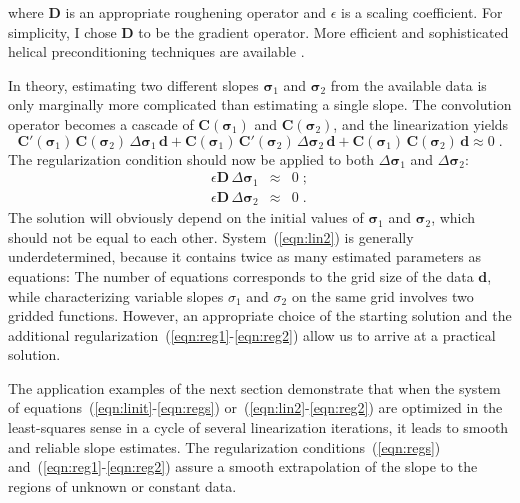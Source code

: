 where $\mathbf{D}$ is an appropriate roughening operator and $\epsilon$
is a scaling coefficient. For simplicity, I chose $\mathbf{D}$ to be the
gradient operator. More efficient and sophisticated helical
preconditioning techniques are available 
\cite[]{GEO63-05-15321541,Fomel.sepphd.107,fandc}.
\par
In theory, estimating two different slopes $\mathbf{\sigma}_1$ and
$\mathbf{\sigma}_2$ from the available data is only marginally more
complicated than estimating a single slope. The convolution operator
becomes a cascade of $\mathbf{C}(\mathbf{\sigma}_1)$ and
$\mathbf{C}(\mathbf{\sigma}_2)$, and the linearization yields
\begin{equation}
  \label{eqn:lin2}
  \mathbf{C}'(\mathbf{\sigma}_1) \, \mathbf{C}(\mathbf{\sigma}_2) \, 
  \Delta \mathbf{\sigma}_1\, \mathbf{d} + \mathbf{C}(\mathbf{\sigma}_1) \, 
  \mathbf{C}'(\mathbf{\sigma}_2) \,
  \Delta \mathbf{\sigma}_2 \, \mathbf{d} + \mathbf{C}(\mathbf{\sigma}_1) \,
  \mathbf{C}(\mathbf{\sigma}_2) \, \mathbf{d} \approx 0\;.
\end{equation}
The regularization condition should now be applied to both $\Delta
\mathbf{\sigma}_1$ and $\Delta \mathbf{\sigma}_2$:
 \begin{eqnarray}
  \label{eqn:reg1}
  \epsilon \mathbf{D} \, \Delta \mathbf{\sigma}_1 & \approx & 0\;; \\
  \label{eqn:reg2}
  \epsilon \mathbf{D} \, \Delta \mathbf{\sigma}_2 & \approx & 0\;.
\end{eqnarray}
The solution will obviously depend on the initial values of
$\mathbf{\sigma}_1$ and $\mathbf{\sigma}_2$, which should not be equal to
each other. System~(\ref{eqn:lin2}) is generally underdetermined,
because it contains twice as many estimated parameters as equations:
The number of equations corresponds to the grid size of the data
$\mathbf{d}$, while characterizing variable slopes $\sigma_1$ and
$\sigma_2$ on the same grid involves two gridded functions.  However,
an appropriate choice of the starting solution and the additional
regularization~(\ref{eqn:reg1}-\ref{eqn:reg2}) allow us to arrive at a
practical solution.
\par
The application examples of the next section demonstrate that when the
system of equations~(\ref{eqn:linit}-\ref{eqn:regs})
or~(\ref{eqn:lin2}-\ref{eqn:reg2}) are optimized in the least-squares
sense in a cycle of several linearization iterations, it leads to
smooth and reliable slope estimates. The regularization
conditions~(\ref{eqn:regs}) and~(\ref{eqn:reg1}-\ref{eqn:reg2}) assure
a smooth extrapolation of the slope to the regions of unknown or
constant data.

